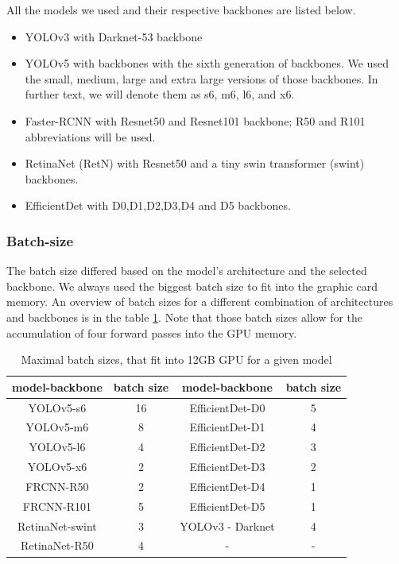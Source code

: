 All the models we used and their respective backbones are listed below.
\begin{itemize}
    \item YOLOv3 with Darknet-53 backbone
    \item YOLOv5 with backbones with the sixth generation of backbones. We used the small, medium, large and extra large versions of those backbones. In further text, we will denote them as s6, m6, l6, and x6.
    \item Faster-RCNN with Resnet50 and Resnet101 backbone; R50 and R101 abbreviations will be used.
    \item RetinaNet (RetN) with Resnet50 and a tiny swin transformer (swint) backbones.
    \item EfficientDet with D0,D1,D2,D3,D4 and D5 backbones.
\end{itemize}

\subsubsection{Batch-size}
The batch size differed based on the model's architecture and the selected backbone. We always used the biggest batch size to fit into the graphic card memory. An overview of batch sizes for a different combination of architectures and backbones is in the table \ref{tab:batch_sizes}. Note that those batch sizes allow for the accumulation of four forward passes into the GPU memory.

\begin{table}
    \centering
    \begin{tabular}{|c|c|c|c|}
        \hline
        model-backbone  & batch size & model-backbone   & batch size \\ \hline
        YOLOv5-s6       & 16         & EfficientDet-D0  & 5          \\ \hline
        YOLOv5-m6       & 8          & EfficientDet-D1  & 4          \\ \hline
        YOLOv5-l6       & 4          & EfficientDet-D2  & 3          \\ \hline
        YOLOv5-x6       & 2          & EfficientDet-D3  & 2          \\ \hline
        FRCNN-R50       & 2          & EfficientDet-D4  & 1          \\ \hline
        FRCNN-R101      & 5          & EfficientDet-D5  & 1          \\ \hline
        RetinaNet-swint & 3          & YOLOv3 - Darknet & 4          \\ \hline
        RetinaNet-R50   & 4          & -                & -          \\ \hline
    \end{tabular}
    \caption{Maximal batch sizes, that fit into 12GB GPU for a given model}
    \label{tab:batch_sizes}
\end{table}



